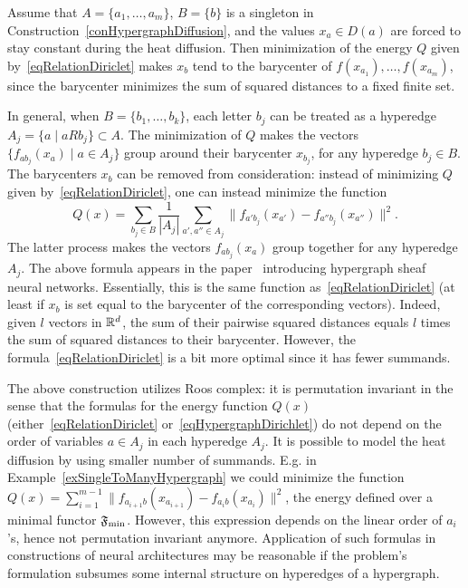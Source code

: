 \begin{ex}\label{exSingleToManyHypergraph}
Assume that $A=\{a_1,\ldots,a_m\}$, $B=\{b\}$ is a singleton in Construction~\ref{conHypergraphDiffusion}, and the values $x_a\in D(a)$ are forced to stay constant during the heat diffusion. Then minimization of the energy $Q$ given by~\eqref{eqRelationDiriclet} makes $x_b$ tend to the barycenter of $f(x_{a_1}),\ldots,f(x_{a_m})$, since the barycenter minimizes the sum of squared distances to a fixed finite set.
\end{ex}

\begin{rem}\label{remRelationGrouping}
In general, when $B=\{b_1,\ldots,b_k\}$, each letter $b_j$ can be treated as a hyperedge $A_j=\{a\mid aRb_j\}\subset A$. The minimization of $Q$ makes the vectors $\{f_{ab_j}(x_a)\mid a\in A_j\}$ group around their barycenter $x_{b_j}$, for any hyperedge $b_j\in B$. The barycenters $x_b$ can be removed from consideration: instead of minimizing $Q$ given by~\eqref{eqRelationDiriclet}, one can instead minimize the function
\begin{equation}\label{eqHypergraphDirichlet}
Q(x)=\sum_{b_j\in B} \frac{1}{|A_j|}\sum_{a',a''\in A_j}\|f_{a'b_j}(x_{a'})-f_{a''b_j}(x_{a''})\|^2.
\end{equation}
The latter process makes the vectors $f_{ab_j}(x_a)$ group together for any hyperedge $A_j$. The above formula appears in the paper~\cite{duta2024sheaf} introducing hypergraph sheaf neural networks. Essentially, this is the same function as~\eqref{eqRelationDiriclet} (at least if $x_b$ is set equal to the barycenter of the corresponding vectors). Indeed, given $l$ vectors in $\mathbb{R}^d$, the sum of their pairwise squared distances equals $l$ times the sum of squared distances to their barycenter. However, the formula~\eqref{eqRelationDiriclet} is a bit more optimal since it has fewer summands. 
\end{rem}

\begin{rem}\label{remInternalStructureOfHyperedges}
The above construction utilizes Roos complex: it is permutation invariant in the sense that the formulas for the energy function $Q(x)$ (either~\eqref{eqRelationDiriclet} or~\eqref{eqHypergraphDirichlet}) do not depend on the order of variables $a\in A_j$ in each hyperedge $A_j$. It is possible to model the heat diffusion by using smaller number of summands. E.g. in Example~\ref{exSingleToManyHypergraph} we could minimize the function $Q(x)=\sum_{i=1}^{m-1}\|f_{a_{i+1}b}(x_{a_{i+1}})-f_{a_ib}(x_{a_i})\|^2$, the energy defined over a minimal functor $\mathfrak{F}_{\min}$. However, this expression depends on the linear order of $a_i$'s, hence not permutation invariant anymore. Application of such formulas in constructions of neural architectures may be reasonable if the problem's formulation subsumes some internal structure on hyperedges of a hypergraph.
\end{rem}

